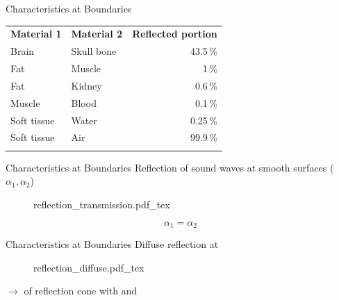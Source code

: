\begin{frame}{Characteristics at Boundaries \cont}
    \vspace{0.6cm}
    \begin{center}
        \begin{tabular}{llr}
            \toprule{}
            \textbf{Material 1}                  & \textbf{Material 2} & \textbf{Reflected portion} \\
            \rowcolor{faublue!10}\midrule{}Brain & Skull bone          & 43.5\,\%                   \\
            Fat                                  & Muscle              & 1\,\%                      \\
            \rowcolor{faublue!10}Fat             & Kidney              & 0.6\,\%                    \\
            Muscle                               & Blood               & 0.1\,\%                    \\
            \rowcolor{faublue!10}Soft tissue     & Water               & 0.25\,\%                   \\
            Soft tissue                          & Air                 & 99.9\,\%                   \\
            \bottomrule{}
        \end{tabular}
    \end{center}

\end{frame}


\begin{frame}{Characteristics at Boundaries \cont}
    Reflection of sound waves at smooth surfaces ( $\alpha_1, \alpha_2$)
    \begin{figure}
        \def\svgwidth{.5\linewidth}
        {reflection_transmission.pdf_tex}
    \end{figure}
    $$\alpha_1 = \alpha_2$$

\end{frame}


\begin{frame}{Characteristics at Boundaries \cont}
    Diffuse reflection at 
    \begin{figure}
        \def\svgwidth{.5\linewidth}
        {reflection_diffuse.pdf_tex}
    \end{figure}
    { $\rightarrow$  of reflection cone  with  and }

\end{frame}


